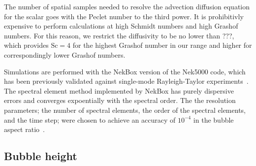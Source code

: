 The number of spatial samples needed to resolve the advection diffusion equation for the scalar goes with the Peclet number to the third power.
It is prohibitivly expensive to perform calculations at high Schmidt numbers and high Grashof numbers.  
For this reason, we restrict the diffusivity to be no lower than ???, which provides $\text{Sc} = 4$ for the highest Grashof number in our range and higher for correspondingly lower Grashof numbers.

Simulations are performed with the NekBox version of the Nek5000 code, which has been previously validated against single-mode Rayleigh-Taylor experiments~\cite{Validation2016,Wilkinson2007}.
The spectral element method implemented by NekBox has purely dispersive errors and converges expoentially with the spectral order.
The the resolution parameters; the number of spectral elements, the order of the spectral elements, and the time step; were chosen to achieve an accuracy of $10^{-4}$ in the bubble aspect ratio~\cite{Convergence2016}.

\subsection{Bubble height}

